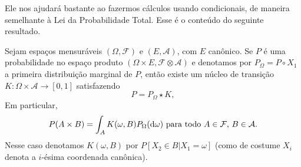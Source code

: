Ele nos ajudará bastante ao fazermos cálculos usando condicionais, de maneira semelhante à Lei da Probabilidade Total.
Esse é o conteúdo do seguinte resultado.

\begin{theorem} 
  \label{desintegracao}
  Sejam espaços mensuráveis $(\Omega, \mathcal{F})$ e $(E, \mathcal{A})$, com $E$ canônico.
  Se $P$ é uma probabilidade no espaço produto $(\Omega \times E, \mathcal{F} \otimes \mathcal{A})$ e denotamos por $P_\Omega = P \circ X_1$ a primeira distribuição marginal de $P$, então existe um núcleo de transição $K: \Omega \times \mathcal{A} \to [0,1]$ satisfazendo
  \begin{equation}
    P = P_\Omega \star K,
  \end{equation}
  Em particular,
  \begin{equation}
    \label{e:prob_cond_reg_prod}
    P(A \times B) = \int_A K(\omega, B) P_\Omega (\mathop{}\!\mathrm{d} \omega) \text{ para todo $A \in \mathcal{F}$, $B \in \mathcal{A}$}.
  \end{equation}
  Nesse caso denotamos $K(\omega, B)$ por $P[X_2 \in B | X_1 = \omega]$ (como de costume $X_i$ denota a $i$-ésima coordenada canônica).
\end{theorem}

